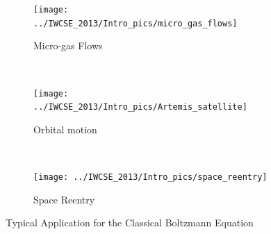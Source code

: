 \begin{frame}
 \begin{figure}
        \centering
        \begin{subfigure}[b]{0.30\textwidth}
                \centering
                \texttt{[image: ../IWCSE\_2013/Intro\_pics/micro\_gas\_flows]}
                \caption{Micro-gas Flows}
                \label{fig:micro_gas_flows}
        \end{subfigure}%
        ~ %
        \begin{subfigure}[b]{0.30\textwidth}
                \centering
                \texttt{[image: ../IWCSE\_2013/Intro\_pics/Artemis\_satellite]}
                \caption{Orbital motion}
                \label{fig:orbital_motion}
        \end{subfigure}
				~ %
        \begin{subfigure}[b]{0.30\textwidth}
                \centering
                \texttt{[image: ../IWCSE\_2013/Intro\_pics/space\_reentry]}
                \caption{Space Reentry}
                \label{fig:space_reentry}
        \end{subfigure}
        \caption{Typical Application for the Classical Boltzmann Equation}
	\label{fig:Classical_Applications}
 \end{figure}
\end{frame}

